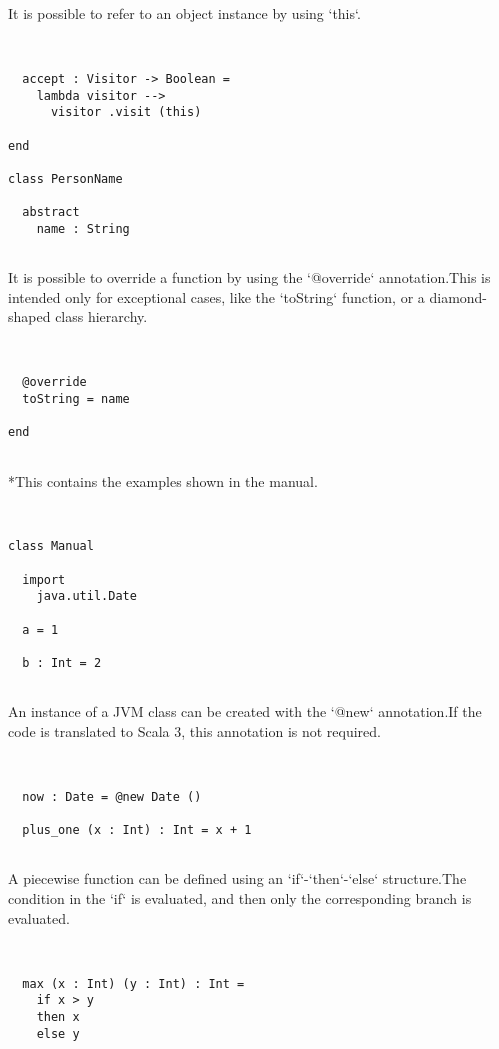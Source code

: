 \documentclass[12pt,a4paper]{article}
\begin{document}
It is possible to refer to an object instance by using `this`. 


\begin{lstlisting}


  accept : Visitor -> Boolean =
    lambda visitor -->
      visitor .visit (this)

end

class PersonName

  abstract
    name : String


\end{lstlisting}

It is possible to override a function by using the `@override` annotation.This is intended only for exceptional cases, like the `toString` function, or a diamond-shaped class hierarchy. 


\begin{lstlisting}


  @override
  toString = name

end


\end{lstlisting}

  *This contains the examples shown in the manual.


\begin{lstlisting}


class Manual

  import
    java.util.Date

  a = 1

  b : Int = 2


\end{lstlisting}

An instance of a JVM class can be created with the `@new` annotation.If the code is translated to Scala 3, this annotation is not required. 


\begin{lstlisting}


  now : Date = @new Date ()

  plus_one (x : Int) : Int = x + 1


\end{lstlisting}

A piecewise function can be defined using an `if`-`then`-`else` structure.The condition in the `if` is evaluated, and then only the corresponding branch is evaluated. 


\begin{lstlisting}


  max (x : Int) (y : Int) : Int =
    if x > y
    then x
    else y


\end{lstlisting}
\end{document}
